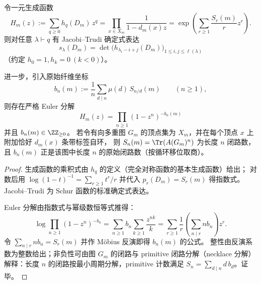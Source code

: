\begin{proposition}\label{prop:pom-schur-trace-jacobi-trudi-euler-primitive-fiber}
令一元生成函数
\[
H_m(z):=\sum_{q\ge 0}h_q(D_m)\,z^q
=\prod_{x\in X_m}\frac{1}{1-d_m(x)z}
=\exp\!\left(\sum_{r\ge 1}\frac{S_r(m)}{r}z^r\right).
\]
则对任意 \(\lambda\vdash q\) 有 Jacobi--Trudi 确定式表达
\[
\boxed{\;
s_\lambda(D_m)=\det\bigl(h_{\lambda_i-i+j}(D_m)\bigr)_{1\le i,j\le \ell(\lambda)}\;}
\]
（约定 \(h_0=1,h_k=0\ (k<0)\)）。
\par
进一步，引入原始纤维坐标
\[
b_n(m):=\frac{1}{n}\sum_{d\mid n}\mu(d)\,S_{n/d}(m)\qquad(n\ge 1),
\]
则存在严格 Euler 分解
\[
\boxed{\;
H_m(z)=\prod_{n\ge 1}(1-z^n)^{-b_n(m)}\;}
\]
并且 \(b_n(m)\in\ZZ_{\ge 0}\)。
若令有向多重图 \(G_m\) 的顶点集为 \(X_m\)，并在每个顶点 \(x\) 上附加恰好 \(d_m(x)\) 条带标签自环，
则 \(S_n(m)=\Tr(A(G_m)^n)\) 为长度 \(n\) 闭路数，且 \(b_n(m)\) 正是该图中长度 \(n\) 的原始闭路数（按循环移位取商）。
\end{proposition}
\begin{proof}
生成函数的乘积式由 \(h_q\) 的定义（完全对称函数的基本生成函数）给出；
对数后用
\(
\log(1-t)^{-1}=\sum_{r\ge 1}t^r/r
\)
并代入 \(p_r(D_m)=S_r(m)\) 得指数式。
Jacobi--Trudi 为 Schur 函数的标准确定式表达。
\par
Euler 分解由指数式与幂级数恒等式推得：
\[
\log\prod_{n\ge 1}(1-z^n)^{-b_n}
=\sum_{n\ge 1}b_n\sum_{k\ge 1}\frac{z^{nk}}{k}
=\sum_{r\ge 1}\frac{1}{r}\left(\sum_{n\mid r}n b_n\right)z^r.
\]
令 \(\sum_{n\mid r}n b_n=S_r(m)\) 并作 Möbius 反演即得 \(b_n(m)\) 的公式。
整性由反演系数为整数给出；非负性可由图 \(G_m\) 的闭路与 primitive 闭路分解（necklace 分解）解释：长度 \(n\) 的闭路按最小周期分解，primitive 计数满足 \(S_n=\sum_{d\mid n} d\,b_d\)。证毕。
\end{proof}

